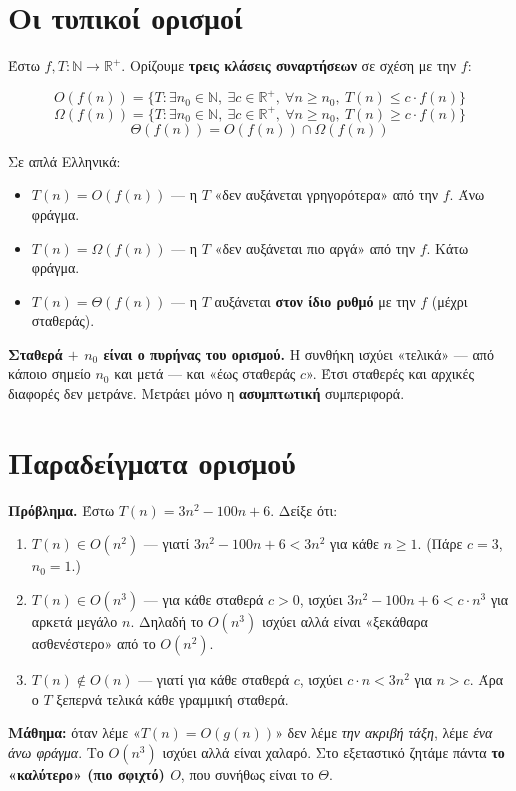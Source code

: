 \documentclass[11pt,a4paper]{article}
\begin{document}
\section{Οι τυπικοί ορισμοί}

Έστω $f, T : \mathbb{N} \to \mathbb{R}^+$. Ορίζουμε \textbf{τρεις κλάσεις
συναρτήσεων} σε σχέση με την $f$:

\[
O(f(n)) = \{T : \exists n_0 \in \mathbb{N},\ \exists c \in \mathbb{R}^+,\
\forall n \ge n_0,\ T(n) \le c \cdot f(n)\}
\]
\[
\Omega(f(n)) = \{T : \exists n_0 \in \mathbb{N},\ \exists c \in \mathbb{R}^+,\
\forall n \ge n_0,\ T(n) \ge c \cdot f(n)\}
\]
\[
\Theta(f(n)) = O(f(n)) \cap \Omega(f(n))
\]

Σε απλά Ελληνικά:
\begin{itemize}
  \item $T(n) = O(f(n))$ --- η $T$ «δεν αυξάνεται γρηγορότερα» από την $f$. Άνω
  φράγμα.
  \item $T(n) = \Omega(f(n))$ --- η $T$ «δεν αυξάνεται πιο αργά» από την $f$. Κάτω
  φράγμα.
  \item $T(n) = \Theta(f(n))$ --- η $T$ αυξάνεται \textbf{στον ίδιο ρυθμό} με την
  $f$ (μέχρι σταθεράς).
\end{itemize}

\begin{keypoint}
\textbf{Σταθερά $+$ $n_0$ είναι ο πυρήνας του ορισμού.} Η συνθήκη ισχύει
«τελικά» --- από κάποιο σημείο $n_0$ και μετά --- και «έως σταθεράς $c$». Έτσι
σταθερές και αρχικές διαφορές δεν μετράνε. Μετράει μόνο η \textbf{ασυμπτωτική}
συμπεριφορά.
\end{keypoint}

\section{Παραδείγματα ορισμού}

\begin{examplebox}
\textbf{Πρόβλημα.} Έστω $T(n) = 3n^2 - 100n + 6$. Δείξε ότι:
\begin{enumerate}
  \item $T(n) \in O(n^2)$ --- γιατί $3n^2 - 100n + 6 < 3n^2$ για κάθε $n \ge 1$.
  (Πάρε $c = 3$, $n_0 = 1$.)
  \item $T(n) \in O(n^3)$ --- για κάθε σταθερά $c > 0$, ισχύει
  $3n^2 - 100n + 6 < c \cdot n^3$ για αρκετά μεγάλο $n$. Δηλαδή το $O(n^3)$
  ισχύει αλλά είναι «ξεκάθαρα ασθενέστερο» από το $O(n^2)$.
  \item $T(n) \notin O(n)$ --- γιατί για κάθε σταθερά $c$, ισχύει $c \cdot n <
  3n^2$ για $n > c$. Άρα ο $T$ ξεπερνά τελικά κάθε γραμμική σταθερά.
\end{enumerate}

\textbf{Μάθημα:} όταν λέμε «$T(n) = O(g(n))$» δεν λέμε \textit{την ακριβή τάξη},
λέμε \textit{ένα άνω φράγμα}. Το $O(n^3)$ ισχύει αλλά είναι χαλαρό. Στο εξεταστικό
ζητάμε πάντα \textbf{το «καλύτερο» (πιο σφιχτό) $O$}, που συνήθως είναι το
$\Theta$.
\end{examplebox}
\end{document}
